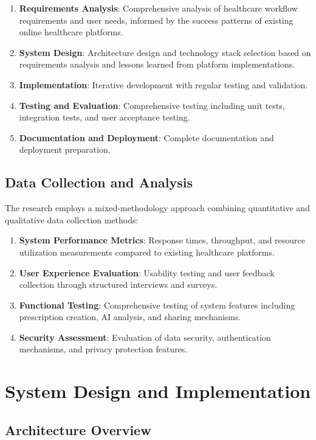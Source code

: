 \documentclass[12pt,a4paper]{article}
\begin{document}
\begin{enumerate}
    \item \textbf{Requirements Analysis}: Comprehensive analysis of healthcare workflow requirements and user needs, informed by the success patterns of existing online healthcare platforms.
    \item \textbf{System Design}: Architecture design and technology stack selection based on requirements analysis and lessons learned from platform implementations.
    \item \textbf{Implementation}: Iterative development with regular testing and validation.
    \item \textbf{Testing and Evaluation}: Comprehensive testing including unit tests, integration tests, and user acceptance testing.
    \item \textbf{Documentation and Deployment}: Complete documentation and deployment preparation.
\end{enumerate}

\subsection{Data Collection and Analysis}

The research employs a mixed-methodology approach combining quantitative and qualitative data collection methods:

\begin{enumerate}
    \item \textbf{System Performance Metrics}: Response times, throughput, and resource utilization measurements compared to existing healthcare platforms.
    \item \textbf{User Experience Evaluation}: Usability testing and user feedback collection through structured interviews and surveys.
    \item \textbf{Functional Testing}: Comprehensive testing of system features including prescription creation, AI analysis, and sharing mechanisms.
    \item \textbf{Security Assessment}: Evaluation of data security, authentication mechanisms, and privacy protection features.
\end{enumerate}

\section{System Design and Implementation}

\subsection{Architecture Overview}
\end{document}
